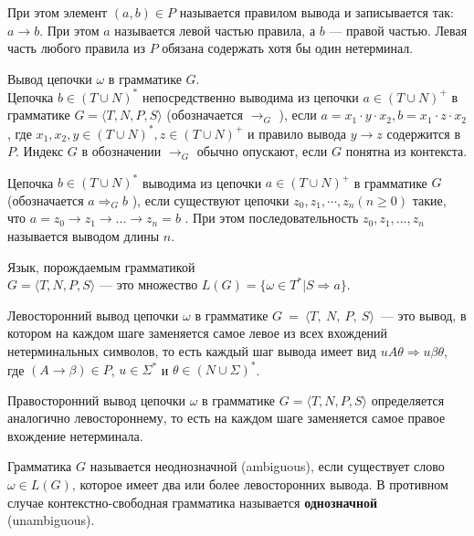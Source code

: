 При этом элемент $(a, b) \in P$ называется правилом вывода и записывается так: $a \rightarrow b$. При этом $a$ называется левой частью правила, а $b$ --- правой частью. Левая часть любого правила из $P$ обязана содержать хотя бы один нетерминал.


\begin{mydef}    
    Вывод цепочки $\omega$ в грамматике $G$.\\  Цепочка $b \in  ( T \cup  N )^*$ непосредственно выводима из цепочки   $a \in ( T \cup N )^+$ в грамматике $G=\langle T, N, P, S \rangle$  (обозначается  $\rightarrow_G$ ), если  $a = x_1 \cdot y \cdot x_2, b = x_1 \cdot z \cdot x_2$, где $x_1, x_2, y \in   (T \cup N )^*, z \in  (T \cup N )^+$ и правило вывода  $y \rightarrow z$  содержится в $P$. Индекс $G$ в обозначении $\rightarrow_G$ обычно опускают, если $G$ понятна из контекста.

Цепочка $b \in  (T \cup  N )^*$  выводима из цепочки  $a \in (T \cup  N)^+$ в грамматике $G$  (обозначается  $a \Rightarrow_G b$ ), если существуют цепочки $z_0, z_1, \cdots, z_n  (n \geq 0)$ такие, что $a = z_0 \rightarrow z_1 \rightarrow ... \rightarrow z_n = b$ . При этом последовательность $z_0, z_1, ..., z_n$ называется выводом длины $n$.
\end{mydef}

\begin{mydef}
    Язык, порождаемым грамматикой \\ $G = \langle T, N, P, S \rangle$ --- это множество $L(G)  = \{ \omega \in T^* | S \Rightarrow a \}$.
\end{mydef}

\begin{mydef}
    Левосторонний вывод цепочки $\omega$ в грамматике  $G~=~\langle T,~N,~P,~S \rangle$~--- это вывод, в котором на каждом шаге заменяется самое левое из всех вхождений нетерминальных символов, то есть каждый шаг вывода имеет вид $u A \theta \Rightarrow u \beta \theta$, где $( A \rightarrow \beta ) \in P$, $u \in \Sigma ^*$ и $\theta \in (N \cup \Sigma)^* $.
\end{mydef}

\begin{mydef}    
    Правосторонний вывод цепочки $\omega$ в грамматике $G=\langle  T, N, P, S  \rangle$ определяется аналогично левостороннему, то есть на каждом шаге заменяется самое правое вхождение нетерминала.
\end{mydef}

\begin{mydef}    
    Грамматика $G$ называется неоднозначной (ambiguous), если существует слово $\omega \in L(G)$, которое имеет два или более левосторонних вывода. В противном случае контекстно-свободная грамматика называется \textbf{однозначной} (unambiguous). 
\end{mydef}


